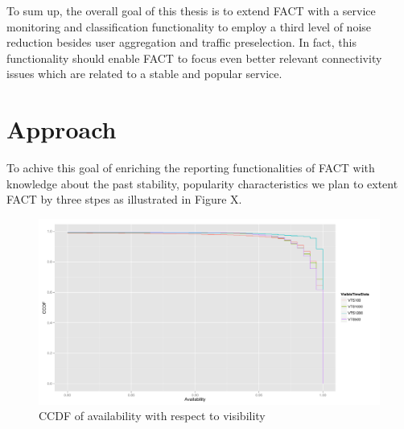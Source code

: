 \documentclass{sigcomm-alternate}
\begin{document}
%
%
To sum up, the overall goal of this thesis is to extend FACT with
a service monitoring and classification functionality to employ a
third level of noise reduction besides user aggregation and traffic
preselection. In fact, this functionality should enable FACT to focus
even better relevant connectivity issues which are related to a stable
and popular service.

\section{Approach}
To achive this goal of enriching the reporting functionalities of FACT
with knowledge about the past stability, popularity characteristics
we plan to extent FACT by three stpes as illustrated in Figure X.

\begin{figure}[ht!]
\centering \includegraphics[width=18cm]{images/RATIO_VTS_External.pdf}
\caption{CCDF of availability with respect to visibility}
\label{fig:RatioVTS} 
\end{figure}
\end{document}
